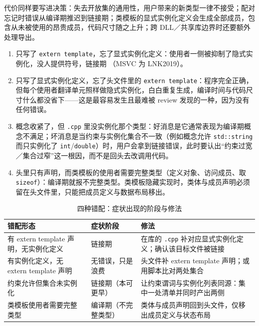 \documentclass[12pt,a4paper,fontset=fandol]{ctexbook}
\newcommand{\kw}[1]{\texttt{#1}}
\newcommand{\seqkw}[1]{\seqsplit{\texttt{#1}}}
\begin{document}
代价同样要写进决策：失去开放集的通用性，用户带来的新类型一律不接受；配对忘记时错误从编译期推迟到链接期；类模板的显式实例化定义会生成全部成员，包含从未被使用的昂贵成员，代码尺寸随之上升；跨 DLL／共享库边界时还要额外处理导出。

\begin{warning}[title={四种典型错配与其症状}]
\begin{enumerate}
  \item 只写了 \kw{extern template}，忘了显式实例化定义：使用者一侧被抑制了隐式实例化，没人提供符号，链接期 \seqkw{undefined reference}（MSVC 为 LNK2019）。
  \item 只写了显式实例化定义，忘了头文件里的 \kw{extern template}：程序完全正确，但每个使用者翻译单元照样做隐式实例化，白白重复生成，编译时间与代码尺寸什么都没省下——这是最容易发生且最难被 review 发现的一种，因为没有任何错误。
  \item 概念收紧了，但 \kw{.cpp} 里没实例化那个类型：好消息是它通常表现为编译期概念不满足；坏消息是当约束与实例化集合不一致（例如概念允许 \kw{std::string} 而只实例化了 \kw{int}/\kw{double}）时，用户会拿到链接错误，此时要认出“约束过宽／集合过窄”这一根因，而不是回头去改调用代码。
  \item 头里只有声明，而类模板的使用者需要完整类型（定义对象、访问成员、取 \kw{sizeof}）：编译期就报不完整类型。类模板隐藏实现时，类体与成员声明必须留在头文件里，只能把成员定义与数据布局移出。
\end{enumerate}
\end{warning}

\begin{table}[htbp]
\centering
\caption{四种错配：症状出现的阶段与修法}
\begin{tabularx}{0.83\textwidth}{>{\raggedright\arraybackslash}p{} >{\raggedright\arraybackslash}p{} X}
\toprule
\textbf{错配形态} & \textbf{症状阶段} & \textbf{修法} \\
\midrule
有 extern template 声明，无实例化定义 & 链接期 & 在库的 \kw{.cpp} 补对应显式实例化定义；确认该目标文件被链接 \\
\addlinespace
有实例化定义，无 extern template 声明 & 无错误，只是浪费 & 头文件补 extern template 声明；或用脚本比对两处集合 \\
\addlinespace
约束允许但集合未实例化 & 链接期（本可更早） & 让约束谓词与实例化列表同源：集中一处清单并同时产出两侧 \\
\addlinespace
类模板使用者需要完整类型 & 编译期（不完整类型） & 类体与成员声明回到头文件，仅移出成员定义与状态布局 \\
\bottomrule
\end{tabularx}
\end{table}
\end{document}
